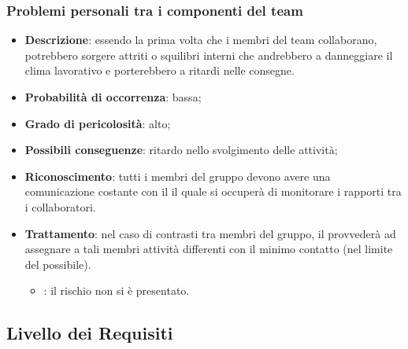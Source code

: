 \documentclass[PianoDiProgetto.tex]{subfiles}
\begin{document}
		\subsubsection{Problemi personali tra i componenti del team}
			\label{sec:pptc}
\begin{itemize}
		\item \textbf{Descrizione}: essendo la prima volta che i membri del team collaborano, potrebbero sorgere attriti o squilibri interni che andrebbero a danneggiare il clima lavorativo e porterebbero a ritardi nelle consegne.
		\item \textbf{Probabilità di occorrenza}: bassa;
		\item \textbf{Grado di pericolosità}: alto;
		\item \textbf{Possibili conseguenze}: ritardo nello svolgimento delle attività;
		\item \textbf{Riconoscimento}: tutti i membri del gruppo devono avere una comunicazione costante con il \RESP{} il quale si occuperà di monitorare i rapporti tra i collaboratori.
		\item \textbf{Trattamento}: nel caso di contrasti tra membri del gruppo, il \RESP{} provvederà ad assegnare a tali membri attività differenti con il minimo contatto (nel limite del possibile).
		\begin{itemize}
				\item \ARdoc : il rischio non si è presentato.
		\end{itemize}
	\end{itemize}
	
	\subsection{Livello dei Requisiti}
\end{document}
